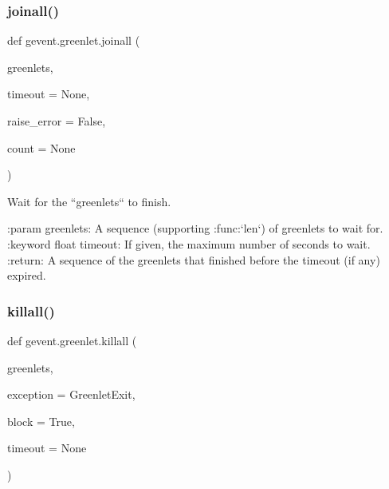 \subsubsection{\texorpdfstring{joinall()}{joinall()}}
{\footnotesize\ttfamily def gevent.\+greenlet.\+joinall (\begin{DoxyParamCaption}\item[{}]{greenlets,  }\item[{}]{timeout = {\ttfamily None},  }\item[{}]{raise\+\_\+error = {\ttfamily False},  }\item[{}]{count = {\ttfamily None} }\end{DoxyParamCaption})}

\begin{DoxyVerb}Wait for the ``greenlets`` to finish.

:param greenlets: A sequence (supporting :func:`len`) of greenlets to wait for.
:keyword float timeout: If given, the maximum number of seconds to wait.
:return: A sequence of the greenlets that finished before the timeout (if any)
    expired.
\end{DoxyVerb}
 \mbox{\label{namespacegevent_1_1greenlet_a9dcac8b6723aad4f23d624e15c42f661}} 
\subsubsection{\texorpdfstring{killall()}{killall()}}
{\footnotesize\ttfamily def gevent.\+greenlet.\+killall (\begin{DoxyParamCaption}\item[{}]{greenlets,  }\item[{}]{exception = {\ttfamily GreenletExit},  }\item[{}]{block = {\ttfamily True},  }\item[{}]{timeout = {\ttfamily None} }\end{DoxyParamCaption})}


